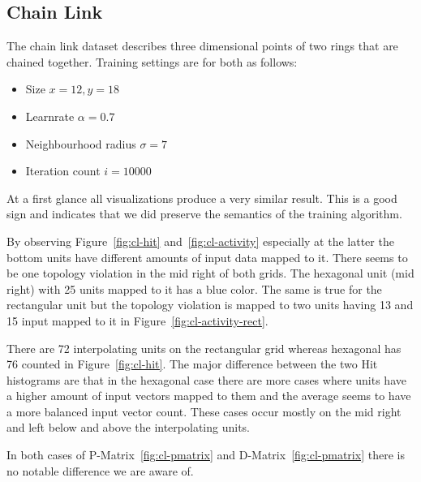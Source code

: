 \documentclass{acm_proc_article-sp}
\begin{document}
\subsection{Chain Link}
\label{sec:chain-link}

The chain link dataset describes three dimensional points of two rings that are chained together. Training settings are for both as follows:
\begin{itemize}
	\item Size $x = 12, y = 18$
	\item Learnrate $\alpha = 0.7$
	\item Neighbourhood radius $\sigma = 7$
	\item Iteration count $i = 10000$
\end{itemize}

At a first glance all visualizations produce a very similar result. This is a good sign and indicates that we did preserve the semantics of the training algorithm.


By observing Figure~\ref{fig:cl-hit} and~\ref{fig:cl-activity} especially at the latter the
bottom units have different amounts of input data mapped to it. There seems to be one topology
violation in the mid right of both grids. The hexagonal unit (mid right) with 25 units mapped to it has a blue
color. The same is true for the rectangular unit but the topology violation is mapped to two units
having 13 and 15 input mapped to it in Figure~\ref{fig:cl-activity-rect}.

There are 72 interpolating units on the rectangular grid whereas hexagonal has 76 counted in Figure~\ref{fig:cl-hit}. The major difference between the two Hit histograms are that in the
hexagonal case there are more cases where units have a higher amount of input vectors mapped
to them and the average seems to have a more balanced input vector count. These cases occur mostly
on the mid right and left below and above the interpolating units.


In both cases of P-Matrix~\ref{fig:cl-pmatrix} and D-Matrix~\ref{fig:cl-pmatrix} there is no notable difference we are aware of.
\end{document}

